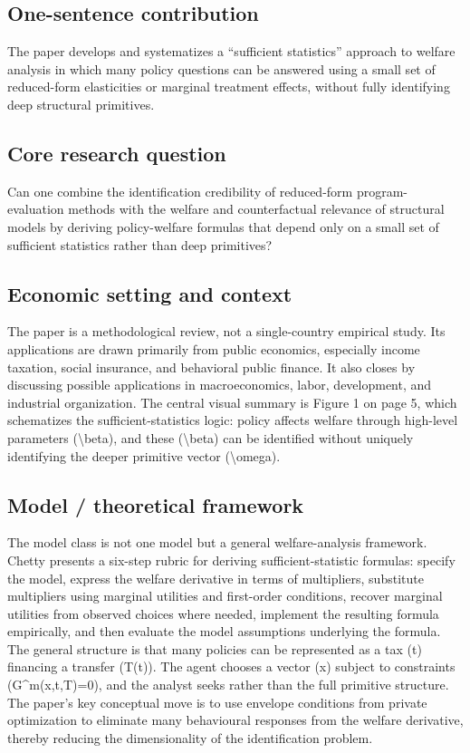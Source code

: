 \documentclass[11pt,a4paper]{article}
\begin{document}
\subsection*{One-sentence contribution}
The paper develops and systematizes a “sufficient statistics” approach to welfare analysis in which many policy questions can be answered using a small set of reduced-form elasticities or marginal treatment effects, without fully identifying deep structural primitives.

\subsection*{Core research question}
Can one combine the identification credibility of reduced-form program-evaluation methods with the welfare and counterfactual relevance of structural models by deriving policy-welfare formulas that depend only on a small set of sufficient statistics rather than deep primitives?

\subsection*{Economic setting and context}
The paper is a methodological review, not a single-country empirical study. Its applications are drawn primarily from public economics, especially income taxation, social insurance, and behavioral public finance. It also closes by discussing possible applications in macroeconomics, labor, development, and industrial organization. The central visual summary is Figure 1 on page 5, which schematizes the sufficient-statistics logic: policy affects welfare through high-level parameters (\textbackslash{}beta), and these (\textbackslash{}beta) can be identified without uniquely identifying the deeper primitive vector (\textbackslash{}omega).

\subsection*{Model / theoretical framework}
The model class is not one model but a general welfare-analysis framework. Chetty presents a six-step rubric for deriving sufficient-statistic formulas: specify the model, express the welfare derivative in terms of multipliers, substitute multipliers using marginal utilities and first-order conditions, recover marginal utilities from observed choices where needed, implement the resulting formula empirically, and then evaluate the model assumptions underlying the formula. The general structure is that many policies can be represented as a tax (t) financing a transfer (T(t)). The agent chooses a vector (x) subject to constraints (G\textasciicircum{}m(x,t,T)=0), and the analyst seeks rather than the full primitive structure. The paper’s key conceptual move is to use envelope conditions from private optimization to eliminate many behavioural responses from the welfare derivative, thereby reducing the dimensionality of the identification problem.
\end{document}
